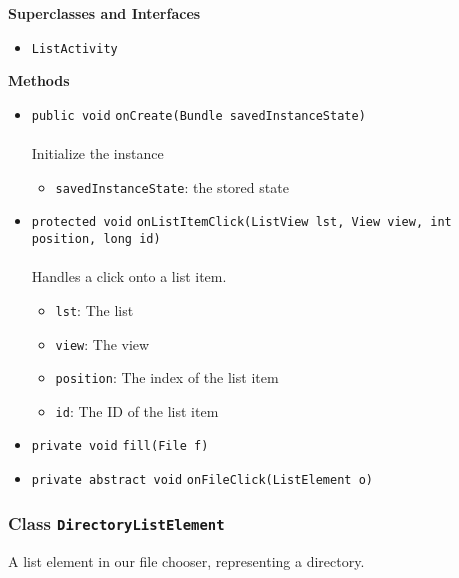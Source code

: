 \textbf{\sffamily Superclasses and Interfaces}
\begin{itemize}
\item \lstinline|ListActivity|
\end{itemize}



\textbf{\sffamily Methods}
\begin{itemize}
\item \lstinline|public void| \lstinline|onCreate|\lstinline|(Bundle savedInstanceState)|\\ \\[-0.6em]
Initialize the instance
\begin{itemize}
\item \lstinline|savedInstanceState|: the stored state
\end{itemize}



\item \lstinline|protected void| \lstinline|onListItemClick|\lstinline|(ListView lst, View view, int position, long id)|\\ \\[-0.6em]
Handles a click onto a list item.
\begin{itemize}
\item \lstinline|lst|: The list
\item \lstinline|view|: The view
\item \lstinline|position|: The index of the list item
\item \lstinline|id|: The ID of the list item
\end{itemize}



\item \lstinline|private void| \lstinline|fill|\lstinline|(File f)| \\[-0.6em]




\item \lstinline|private abstract void| \lstinline|onFileClick|\lstinline|(ListElement o)| \\[-0.6em]




\end{itemize}

\subsubsection{Class \lstinline|DirectoryListElement|}
A list element in our file chooser, representing a directory. \\
\noindent\begin{minipage}[t]{5cm}
\vspace{0.3em}
\hspace*{2em}
\vspace{0.3em}
\end{minipage}



